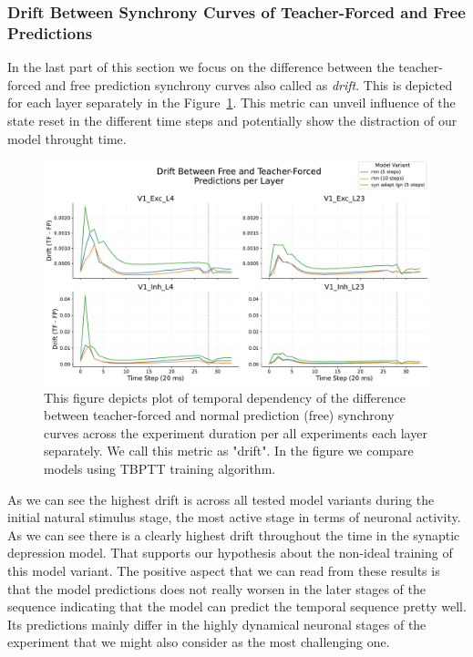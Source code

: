 \subsubsection{Drift Between Synchrony Curves of Teacher-Forced and Free Predictions}
\label{subsubsec:drift_teacher_free_synchrony}

In the last part of this section we focus on the difference between the teacher-forced and free prediction synchrony curves also called as \emph{drift}. This is depicted for each layer separately in the Figure~\ref{fig:teacher_forced_free_drift}. This metric can unveil influence of the state reset in the different time steps and potentially show the distraction of our model throught time.

\begin{figure}
    \centering
    \includegraphics[width=\linewidth]{img/plots/temporal_drift_forced_free.pdf}
    \caption{This figure depicts plot of temporal dependency of the difference between teacher-forced and normal prediction (free) synchrony curves across the experiment duration per all experiments each layer separately. We call this metric as "drift". In the figure we compare models using TBPTT training algorithm.}
    \label{fig:teacher_forced_free_drift}
\end{figure}

As we can see the highest drift is across all tested model variants during the initial natural stimulus stage, the most active stage in terms of neuronal activity. As we can see there is a clearly highest drift throughout the time in the synaptic depression model. That supports our hypothesis about the non-ideal training of this model variant. The positive aspect that we can read from these results is that the model predictions does not really worsen in the later stages of the sequence indicating that the model can predict the temporal sequence pretty well. Its predictions mainly differ in the highly dynamical neuronal stages of the experiment that we might also consider as the most challenging one.

